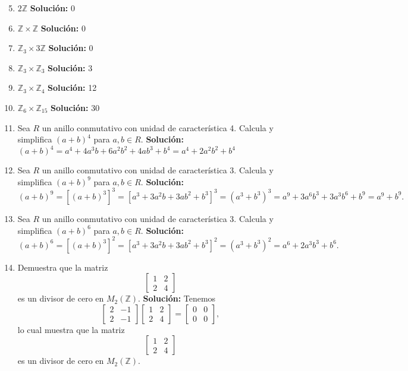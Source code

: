 \begin{enumerate}
	\setcounter{enumi}{4}
	\item $2\mathbb{Z}$ \textbf{Solución:} 0
	\item $\mathbb{Z} \times \mathbb{Z}$ \textbf{Solución:} 0
	\item $\mathbb{Z}_3 \times 3\mathbb{Z}$ \textbf{Solución:} 0
	\item $\mathbb{Z}_3 \times \mathbb{Z}_3$ \textbf{Solución:} 3
	\item $\mathbb{Z}_3 \times \mathbb{Z}_4$ \textbf{Solución:} 12
	\item $\mathbb{Z}_6 \times \mathbb{Z}_{15}$ \textbf{Solución:} 30
	
	\item Sea $R$ un anillo conmutativo con unidad de característica 4. Calcula y simplifica $(a + b)^4$ para $a, b \in R$. \textbf{Solución:}  $(a + b)^4 = a^4 + 4a^3b + 6a^2b^2 + 4ab^3 + b^4=a^{4}+2a^{2}b^{2}+b^{4}$
	\item Sea $R$ un anillo conmutativo con unidad de característica 3. Calcula y simplifica $(a + b)^9$ para $a, b \in R$. \textbf{Solución:}  \[(a + b)^9 = [(a + b)^3]^3 = [a^3 + 3a^2b + 3ab^2 + b^3]^3 = (a^3 + b^3)^3 = a^9 + 3a^6b^3 + 3a^3b^6 + b^9 = a^9 + b^9.\]
	\item Sea $R$ un anillo conmutativo con unidad de característica 3. Calcula y simplifica $(a + b)^6$ para $a, b \in R$. \textbf{Solución:}  \[(a + b)^6 = [(a + b)^3]^2 = [a^3 + 3a^2b + 3ab^2 + b^3]^2 = (a^3 + b^3)^2 = a^6 + 2a^3b^3 + b^6.\]
	\item Demuestra que la matriz
	\[
	\begin{bmatrix}
		1 & 2 \\
		2 & 4
	\end{bmatrix}
	\]
	es un divisor de cero en $M_2(\mathbb{Z})$. \textbf{Solución:}
	Tenemos
	\[
	\begin{bmatrix}
		2 & -1 \\
		2 & -1
	\end{bmatrix}
	\begin{bmatrix}
		1 & 2 \\
		2 & 4
	\end{bmatrix}
	=
	\begin{bmatrix}
		0 & 0 \\
		0 & 0
	\end{bmatrix},
	\]
	lo cual muestra que la matriz
	\[
	\begin{bmatrix}
		1 & 2 \\
		2 & 4
	\end{bmatrix}
	\]
	es un divisor de cero en $M_2(\mathbb{Z})$.
\end{enumerate}
	
